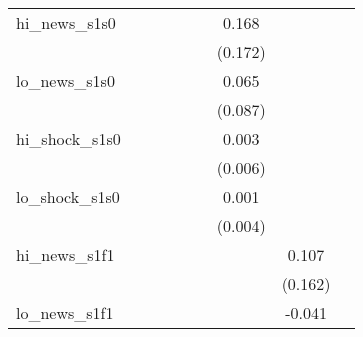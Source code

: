 {\begin{tabular}{l*{8}{c}}
\addlinespace
hi\_news\_s1s0&                     &                     &                     &                     &                     &       0.168         &                     &                     \\
            &                     &                     &                     &                     &                     &     (0.172)         &                     &                     \\
\addlinespace
lo\_news\_s1s0&                     &                     &                     &                     &                     &       0.065         &                     &                     \\
            &                     &                     &                     &                     &                     &     (0.087)         &                     &                     \\
\addlinespace
hi\_shock\_s1s0&                     &                     &                     &                     &                     &       0.003         &                     &                     \\
            &                     &                     &                     &                     &                     &     (0.006)         &                     &                     \\
\addlinespace
lo\_shock\_s1s0&                     &                     &                     &                     &                     &       0.001         &                     &                     \\
            &                     &                     &                     &                     &                     &     (0.004)         &                     &                     \\
\addlinespace
hi\_news\_s1f1&                     &                     &                     &                     &                     &                     &       0.107         &                     \\
            &                     &                     &                     &                     &                     &                     &     (0.162)         &                     \\
\addlinespace
lo\_news\_s1f1&                     &                     &                     &                     &                     &                     &      -0.041         &                     \\

\end{tabular}}
